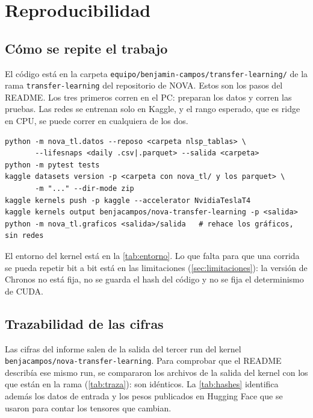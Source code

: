 \chapter{Reproducibilidad}\label{ap:reproducibilidad}

\section{Cómo se repite el trabajo}

El código está en la carpeta \texttt{equipo/benjamin-campos/transfer-learning/} de la rama \texttt{transfer-learning}
del repositorio de NOVA. Estos son los pasos del README. Los tres primeros corren en el PC: preparan los datos y
corren las pruebas. Las redes se entrenan solo en Kaggle, y el rango esperado, que es ridge en CPU, se puede correr en
cualquiera de los dos.

\begin{lstlisting}[basicstyle=\ttfamily\footnotesize]
python -m nova_tl.datos --reposo <carpeta nlsp_tablas> \
       --lifesnaps <daily .csv|.parquet> --salida <carpeta>
python -m pytest tests
kaggle datasets version -p <carpeta con nova_tl/ y los parquet> \
       -m "..." --dir-mode zip
kaggle kernels push -p kaggle --accelerator NvidiaTeslaT4
kaggle kernels output benjacampos/nova-transfer-learning -p <salida>
python -m nova_tl.graficos <salida>/salida   # rehace los gráficos, sin redes
\end{lstlisting}

El entorno del kernel está en la \cref{tab:entorno}. Lo que falta para que una corrida se pueda repetir bit a bit está en
las limitaciones (\cref{sec:limitaciones}): la versión de Chronos no está fija, no se guarda el hash del código y no se
fija el determinismo de CUDA.

\section{Trazabilidad de las cifras}

Las cifras del informe salen de la salida del tercer run del kernel \texttt{benjacampos/nova-transfer-learning}. Para
comprobar que el README describía ese mismo run, se compararon los archivos de la salida del kernel con los que están
en la rama (\cref{tab:traza}): son idénticos. La \cref{tab:hashes} identifica además los datos de entrada y los pesos
publicados en Hugging Face que se usaron para contar los tensores que cambian.

\begin{table}[htbp]
\caption[Archivos del kernel y del repositorio]{Archivos de resultados del tercer run: sha256 de la salida del kernel y
de la copia en la rama (primeros 16 caracteres).}
\label{tab:traza}
\centering\small

\end{table}

